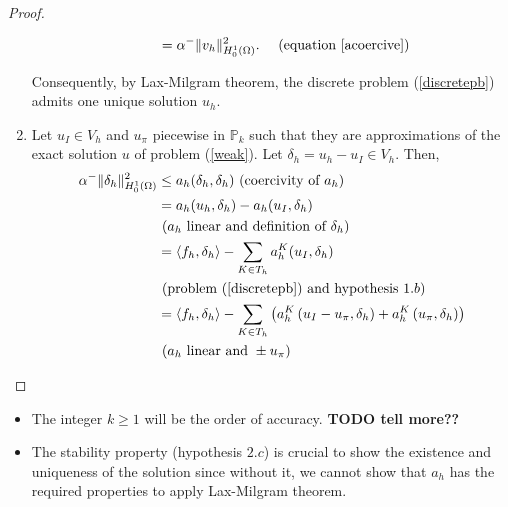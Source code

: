 \begin{proof}
\begin{enumerate}
\begin{itemize}
\begin{align*}
&= \alpha^- \|v_h\|_{H_0^1(\Omega)}^2. &\text{ (equation \ref{acoercive})}
\end{align*}
\end{itemize}
Consequently, by Lax-Milgram theorem, the discrete problem (\ref{discretepb}) admits one unique solution $u_h$.
\item Let $u_I\in V_h$ and $u_\pi$ piecewise in $\mathbb{P}_k$ such that they are approximations of the exact solution $u$ of problem (\ref{weak}). Let $\delta_h = u_h-u_I\in V_h$. Then, 
\begin{align*}
\alpha^-\|\delta_h\|^2_{H_0^1(\Omega)}
&\leq a_h(\delta_h,\delta_h) \text{ (coercivity of }a_h)\\
&= a_h(u_h,\delta_h) - a_h(u_I,\delta_h) \\
& \text{    }(a_h \text{ linear and definition of }\delta_h)\\
&= \langle f_h, \delta_h\rangle - \sum_{K\in T_h}a_h^K(u_I,\delta_h) \\
& \text{    (problem (\ref{discretepb}) and hypothesis }1.b)\\
&= \langle f_h, \delta_h\rangle - \sum_{K\in T_h}\left( a_h^K\left( u_I-u_\pi, \delta_h \right) + a_h^K\left( u_\pi,\delta_h\right) \right)\\
&\text{    } (a_h \text{ linear and }\pm u_\pi)
\end{align*}
\end{enumerate}
\end{proof}

\begin{remark}
\begin{itemize} A few remarks on the theorem:
\item The integer $k\geq 1$ will be the order of accuracy. \textbf{TODO tell more??}
\item The stability property (hypothesis $2.c$) is crucial to show the existence and uniqueness of the solution since without it, we cannot show that $a_h$ has the required properties to apply Lax-Milgram theorem.
\end{itemize}
\end{remark}